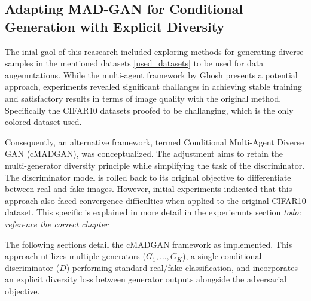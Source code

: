 \newcommand{\definegenerator}{\texttt{define\_generator}}
\newcommand{\definediscriminator}{\texttt{define\_discriminator}}
\newcommand{\lambdadiv}{\lambda_{\text{div}}} 
\subsection[Adapting MAD-GAN for Conditional Generation with Explicit Diversity - CMADGAN]{Adapting MAD-GAN for Conditional Generation with Explicit Diversity}
\label{theoretical_cmadgan}

The inial gaol of this reasearch included exploring methods for generating diverse samples in the mentioned datasets \ref{used_datasets} to be used for data augemntations. While the multi-agent framework by Ghosh presents a potential approach, experiments revealed significant challanges in achieving stable training and satisfactory results in terms of image quality with the original method. Specifically the CIFAR10 datasets proofed to be challanging, which is the only colored dataset used. 

Consequently, an alternative framework, termed Conditional Multi-Agent Diverse GAN (cMADGAN), was conceptualized. The adjustment aims to retain the multi-generator diversity principle while simplifying the task of the discriminator. The discriminator model is rolled back to its original objective to differentiate between real and fake images. However, initial experiments indicated that this approach also faced convergence difficulties when applied to the original CIFAR10 dataset. This specific is explained in more detail in the experiemnts section \textit{todo: reference the correct chapter}


The following sections detail the cMADGAN framework as implemented. This approach utilizes multiple generators (\( G_1, \dots, G_K \)), a single conditional discriminator (\( D \)) performing standard real/fake classification, and incorporates an explicit diversity loss between generator outputs alongside the adversarial objective.


